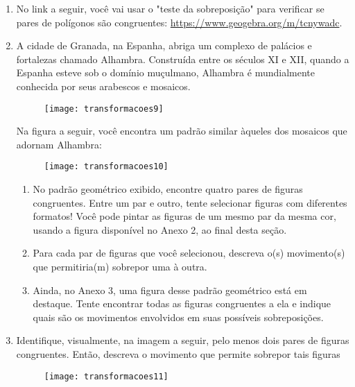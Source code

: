 \begin{enumerate}
\item No link a seguir, você vai usar o "teste da sobreposição" para verificar se pares de polígonos são congruentes: \url{https://www.geogebra.org/m/tcnywadc}.


\item A cidade de Granada, na Espanha, abriga um complexo de palácios e fortalezas chamado Alhambra. Construída entre os séculos XI e XII, quando a Espanha esteve sob o domínio muçulmano, Alhambra é mundialmente conhecida por seus arabescos e mosaicos. 

\begin{figure}[H]
\centering

\texttt{[image: transformacoes9]}
\end{figure}

Na figura a seguir, você encontra um padrão similar àqueles dos mosaicos que adornam Alhambra: 


\begin{figure}[H]
\centering

\texttt{[image: transformacoes10]}
\end{figure}

\begin{enumerate}
\item No padrão geométrico exibido, encontre quatro pares de figuras congruentes. Entre um par e outro, tente selecionar figuras com diferentes formatos! Você pode pintar as figuras de um mesmo par da mesma cor, usando a figura disponível no Anexo 2, ao final desta seção. 
\item Para cada par de figuras que você selecionou, descreva o(s) movimento(s) que permitiria(m) sobrepor uma à outra. 
\item Ainda, no Anexo 3, uma figura desse padrão geométrico está em destaque. Tente encontrar todas as figuras congruentes a ela e indique quais são os movimentos envolvidos em suas possíveis sobreposições. 
\end{enumerate}


\item Identifique, visualmente, na imagem a seguir, pelo menos dois pares de figuras congruentes. Então, descreva o movimento que permite sobrepor tais figuras

\begin{figure}[H]
\centering

\texttt{[image: transformacoes11]}
\end{figure}


\end{enumerate}
